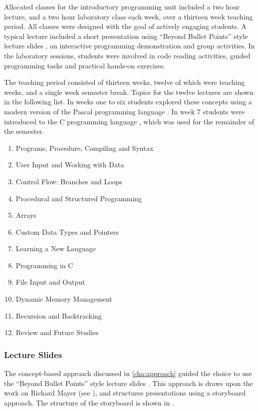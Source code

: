 Allocated classes for the introductory programming unit included a two hour lecture, and a two hour laboratory class each week, over a thirteen week teaching period. All classes were designed with the goal of actively engaging students. A typical lecture included a short presentation using ``Beyond Bullet Points'' style lecture slides \cite{Atkinson:2007}, an interactive programming demonstration and group activities. In the laboratory sessions, students were involved in code reading activities, guided programming tasks and practical hands-on exercises.

The teaching period consisted of thirteen weeks, twelve of which were teaching weeks, and a single week semester break. Topics for the twelve lectures are shown in the following list. In weeks one to six students explored these concepts using a modern version of the Pascal programming language \cite{Wirth:1971,FPC:2011}. In week 7 students were introduced to the C programming language \cite{Ritchie:1978}, which was used for the remainder of the semester. 

\begin{enumerate}
  \item Programs, Procedure, Compiling and Syntax
  \item User Input and Working with Data
  \item Control Flow: Branches and Loops
  \item Procedural and Structured Programming
  \item Arrays
  \item Custom Data Types and Pointers
  \item Learning a New Language
  \item Programming in C
  \item File Input and Output
  \item Dynamic Memory Management
  \item Recursion and Backtracking
  \item Review and Future Studies
\end{enumerate}

\subsubsection{Lecture Slides} %
\label{ssub:lecture_slides}

The concept-based approach discussed in \cref{cha:approach} guided the choice to use the ``Beyond Bullet Points'' style lecture slides \cite{Atkinson:2007}. This approach is draws upon the work on Richard Mayer (see \citet{Mayer:2005}), and structures presentations using a storyboard approach. The structure of the storyboard is shown in .


